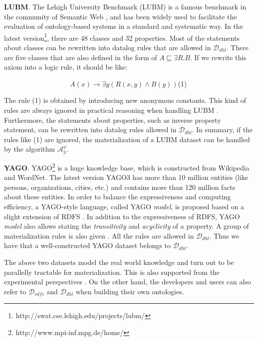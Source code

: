 \documentclass{article}
\begin{document}
\textbf{LUBM}. The Lehigh University Benchmark (LUBM) is a famous benchmark in the community of Semantic Web \cite{DBLP:journals/ws/GuoPH05}, and has been widely used to facilitate the evaluation of ontology-based systems in a standard and systematic way. In the latest version\footnote{http://swat.cse.lehigh.edu/projects/lubm/}, there are 48 classes and 32 properties. Most of the statements about classes can be rewritten into datalog rules that are allowed in $\mathcal{D}_{dhl}$. There are five classes that are also defined in the form of $A\sqsubseteq\exists R.B$. If we rewrite this axiom into a logic rule, it should be like:
\begin{center}
~~~~~~~~~~~~~~~~~~~$A(x)\rightarrow\exists y(R(x,y)\wedge B(y))$\hfill(1)
\end{center}
The rule (1) is obtained by introducing new anonymous constants. This kind of rules are always ignored in
practical reasoning when handling LUBM \cite{DBLP:journals/ws/UrbaniKMHB12,DBLP:conf/semweb/WeaverH09}.
Furthermore, the statements about properties, such as inverse property statement, can be rewritten into datalog rules allowed in $\mathcal{D}_{dhl}$. In summary, if the rules like (1) are ignored, the materialization of a LUBM dataset can be handled by the algorithm $\mathcal{A}_3^{\psi}$.

\textbf{YAGO}. YAGO\footnote{http://www.mpi-inf.mpg.de/home/} is a huge knowledge base, which is constructed from Wikipedia and WordNet. The latest version YAGO3 \cite{DBLP:conf/cidr/MahdisoltaniBS15} has more than 10 million entities (like persons, organizations, cities, etc.) and contains more than 120 million facts about these entities. In order to balance the expressiveness and computing efficiency, a YAGO-style language, called YAGO \emph{model}, is proposed based on a slight extension of RDFS \cite{DBLP:journals/ws/SuchanekKW08}. In addition to the expressiveness of RDFS, YAGO \emph{model} also allows stating the \emph{transitivity} and \emph{acyclicity} of a property. A group of materialization rules is also given \cite{DBLP:journals/ws/SuchanekKW08}. All the rules are allowed in $\mathcal{D}_{dhl}$. Thus we have that a well-constructed YAGO dataset belongs to $\mathcal{D}_{dhl}$.

The above two datasets model the real world knowledge and turn out to be parallelly tractable for materialization.
This is also supported from the experimental perspectives \cite{DBLP:journals/ws/UrbaniKMHB12,DBLP:conf/icde/SundaraAKDWCS10}.
On the other hand, the developers and users can also
refer to $\mathcal{D}_{rdfs}$ and $\mathcal{D}_{dhl}$ when building their own ontologies.
\end{document}
